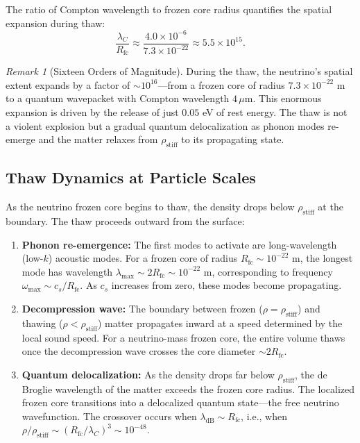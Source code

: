 \documentclass[11pt,a4paper]{article}
\newcommand{\rhostiff}{\ensuremath{\rho_{\mathrm{stiff}}}}
\newcommand{\Rfc}{\ensuremath{R_{\mathrm{fc}}}}
\theoremstyle{definition}
\theoremstyle{remark}
\newtheorem{remark}[theorem]{Remark}
\begin{document}
The ratio of Compton wavelength to frozen core radius quantifies the spatial expansion during thaw:
\begin{equation}
\frac{\lambda_C}{\Rfc} \approx \frac{4.0 \times 10^{-6}}{7.3 \times 10^{-22}} \approx 5.5 \times 10^{15}.
\end{equation}

\begin{remark}[Sixteen Orders of Magnitude]
\label{rem:sixteen_orders}
During the thaw, the neutrino's spatial extent expands by a factor of $\sim 10^{16}$---from a frozen core of radius $7.3 \times 10^{-22}$ m to a quantum wavepacket with Compton wavelength $4\,\mu$m. This enormous expansion is driven by the release of just $0.05$ eV of rest energy. The thaw is not a violent explosion but a gradual quantum delocalization as phonon modes re-emerge and the matter relaxes from $\rhostiff$ to its propagating state.
\end{remark}

\subsection{Thaw Dynamics at Particle Scales}
\label{sec:neutrino_dynamics}

As the neutrino frozen core begins to thaw, the density drops below $\rhostiff$ at the boundary. The thaw proceeds outward from the surface:

\begin{enumerate}[leftmargin=*, itemsep=0.3em]
\item \textbf{Phonon re-emergence:} The first modes to activate are long-wavelength (low-$k$) acoustic modes. For a frozen core of radius $\Rfc \sim 10^{-22}$ m, the longest mode has wavelength $\lambda_{\max} \sim 2\Rfc \sim 10^{-22}$ m, corresponding to frequency $\omega_{\max} \sim c_s / \Rfc$. As $c_s$ increases from zero, these modes become propagating.

\item \textbf{Decompression wave:} The boundary between frozen ($\rho = \rhostiff$) and thawing ($\rho < \rhostiff$) matter propagates inward at a speed determined by the local sound speed. For a neutrino-mass frozen core, the entire volume thaws once the decompression wave crosses the core diameter $\sim 2\Rfc$.

\item \textbf{Quantum delocalization:} As the density drops far below $\rhostiff$, the de Broglie wavelength of the matter exceeds the frozen core radius. The localized frozen core transitions into a delocalized quantum state---the free neutrino wavefunction. The crossover occurs when $\lambda_{\mathrm{dB}} \sim \Rfc$, i.e., when $\rho/\rhostiff \sim (\Rfc/\lambda_C)^3 \sim 10^{-48}$.
\end{enumerate}
\end{document}
